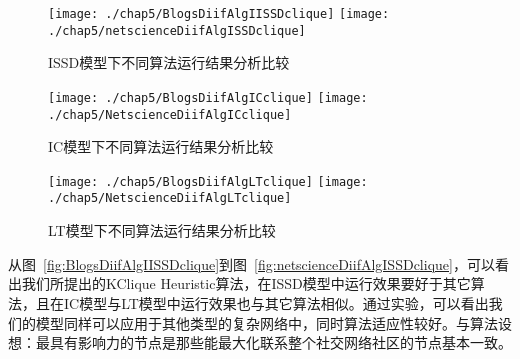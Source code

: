 \begin{figure}[H]
	\centering%
	{\texttt{[image: ./chap5/BlogsDiifAlgIISSDclique]}}
	{\texttt{[image: ./chap5/netscienceDiifAlgISSDclique]}}
	
	\caption{ISSD模型下不同算法运行结果分析比较}
\end{figure}

\begin{figure}[H]
	\centering%
	{\texttt{[image: ./chap5/BlogsDiifAlgICclique]}}
	{\texttt{[image: ./chap5/NetscienceDiifAlgICclique]}}
	
	\caption{IC模型下不同算法运行结果分析比较}
\end{figure}

\begin{figure}[H]
	\centering%
	{\texttt{[image: ./chap5/BlogsDiifAlgLTclique]}}
	{\texttt{[image: ./chap5/NetscienceDiifAlgLTclique]}}
	
	\caption{LT模型下不同算法运行结果分析比较}
\end{figure}

从图~\ref{fig:BlogsDiifAlgIISSDclique}到图~\ref{fig:netscienceDiifAlgISSDclique}，可以看出我们所提出的KClique Heuristic算法，在ISSD模型中运行效果要好于其它算法，且在IC模型与LT模型中运行效果也与其它算法相似。通过实验，可以看出我们的模型同样可以应用于其他类型的复杂网络中，同时算法适应性较好。与算法设想：最具有影响力的节点是那些能最大化联系整个社交网络社区的节点基本一致。

